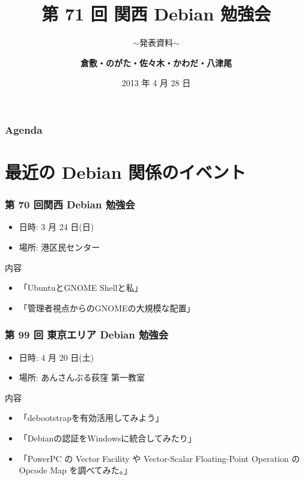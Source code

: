 \documentclass[cjk,dvipdfmx,10pt,compress,%
hyperref={bookmarks=true,bookmarksnumbered=true,bookmarksopen=false,%
colorlinks=false,%
pdftitle={第 71 回 関西 Debian 勉強会},%
pdfauthor={倉敷・のがた・佐々木・かわだ・八津尾},%
pdfsubject={資料},%
}]{beamer}
\title{第 71 回 関西 Debian 勉強会}
\subtitle{$\sim$発表資料$\sim$}
\author[かわだ てつたろう]{{\large\bf 倉敷・のがた・佐々木・かわだ・八津尾}}
\institute[Debian JP]{{\normalsize\tt 関西 Debian 勉強会}}
\date{{\small 2013 年 4 月 28 日}}
\begin{document}
\settitleslide
\begin{frame}
\titlepage
\end{frame}
\setdefaultslide

\begin{frame}[fragile]
\frametitle{Agenda}

\tableofcontents

\end{frame}

\section{最近の Debian 関係のイベント}


\begin{frame}[fragile]
  \frametitle{第 70 回関西 Debian 勉強会}
  \begin{itemize}
  \item 日時: 3 月 24 日(日)
  \item 場所: 港区民センター
  \end{itemize}
  \begin{block}{内容}
    \begin{itemize}
    \item 「UbuntuとGNOME Shellと私」
    \item 「管理者視点からのGNOMEの大規模な配置」
    \end{itemize}
  \end{block}
\end{frame}

\begin{frame}[fragile]
  \frametitle{第 99 回 東京エリア Debian 勉強会}
  \begin{itemize}
  \item 日時: 4 月 20 日(土)
  \item 場所: あんさんぶる荻窪 第一教室
  \end{itemize}
  \begin{block}{内容}
    \begin{itemize}
    \item 「debootstrapを有効活用してみよう」
    \item 「Debianの認証をWindowsに統合してみたり」
    \item 「PowerPC の Vector Facility や Vector-Scalar Floating-Point Operation の Opcode
Map を調べてみた。」
    \end{itemize}
  \end{block}
\end{frame}
\end{document}
